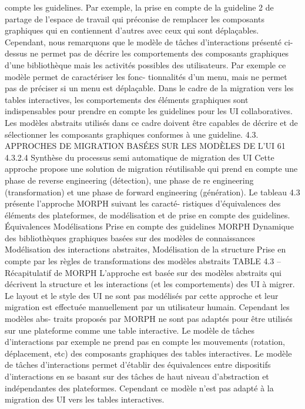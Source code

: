 \documentclass{article}
\begin{document}
compte les guidelines. Par exemple, la prise en compte de la guideline 2 de partage de l’espace de
travail qui préconise de remplacer les composants graphiques qui en contiennent d’autres avec ceux
qui sont déplaçables. Cependant, nous remarquons que le modèle de tâches d’interactions présenté
ci-dessus ne permet pas de décrire les comportements des composants graphiques d’une bibliothèque
mais les activités possibles des utilisateurs. Par exemple ce modèle permet de caractériser les fonc-
tionnalités d’un menu, mais ne permet pas de préciser si un menu est déplaçable. Dans le cadre de la
migration vers les tables interactives, les comportements des éléments graphiques sont indispensables
pour prendre en compte les guidelines pour les UI collaboratives. Les modèles abstraits utilisés dans
ce cadre doivent être capables de décrire et de sélectionner les composants graphiques conformes à
une guideline.
4.3. APPROCHES DE MIGRATION BASÉES SUR LES MODÈLES DE L’UI
61
4.3.2.4
Synthèse du processus semi automatique de migration des UI
Cette approche propose une solution de migration réutilisable qui prend en compte une phase
de reverse engineering (détection), une phase de re engineering (transformation) et une phase de
forward engineering (génération). Le tableau 4.3 présente l’approche MORPH suivant les caracté-
ristiques d’équivalences des éléments des plateformes, de modélisation et de prise en compte des
guidelines.
Équivalences
Modélisations
Prise en compte des
guidelines
MORPH
Dynamique des
bibliothèques
graphiques basées sur
des modèles de
connaissances
Modélisation des
interactions abstraites,
Modélisation de la
structure
Prise en compte par les
règles de
transformations des
modèles abstraits
TABLE 4.3 – Récapitulatif de MORPH
L’approche est basée sur des modèles abstraits qui décrivent la structure et les interactions (et les
comportements) des UI à migrer. Le layout et le style des UI ne sont pas modélisés par cette approche
et leur migration est effectuée manuellement par un utilisateur humain. Cependant les modèles abs-
traits proposés par MORPH ne sont pas adaptés pour être utilisés sur une plateforme comme une table
interactive. Le modèle de tâches d’interactions par exemple ne prend pas en compte les mouvements
(rotation, déplacement, etc) des composants graphiques des tables interactives. Le modèle de tâches
d’interactions permet d’établir des équivalences entre dispositifs d’interactions en se basant sur des
tâches de haut niveau d’abstraction et indépendantes des plateformes. Cependant ce modèle n’est pas
adapté à la migration des UI vers les tables interactives.
\end{document}
